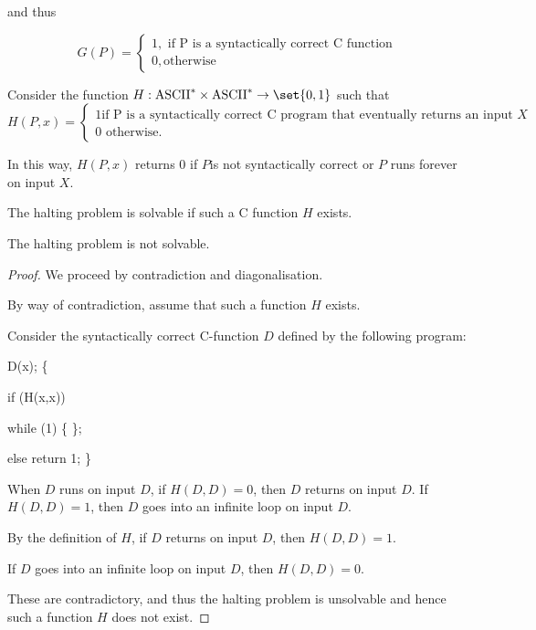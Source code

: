 \documentclass[11pt]{scrartcl}
\begin{document}
and thus

\begin{equation}
  G(P)= \begin{cases}
    1,\text{ if P is a syntactically correct C function}\\
    0, \text{otherwise}
  \end{cases}
\end{equation}

Consider the function $H:\text{ASCII}^{*}\times \text{ASCII}^{*} \to \set{0, 1}$ such that
\[
  H(P, x) =
\begin{cases}
  1 \text{if P is a syntactically correct C program that eventually returns an input $X$}\\
  0 \text{ otherwise}.
\end{cases}
\]

In this way, $H(P, x)$ returns $0$ if $P$is not syntactically correct or $P$ runs forever on input $X$.

The halting problem is solvable if such a C function $H$ exists.

\begin{theorem}
The halting problem is not solvable.
\end{theorem}

\begin{proof}
  \hfill

  We proceed by contradiction and diagonalisation.

  By way of contradiction, assume that such a function $H$ exists.

  Consider the syntactically correct C-function $D$ defined by the following program:

  D(x); \{

  if (H(x,x))

  while (1) \{
  \};
  
  else return 1;
  \}

  When $D$ runs on input $D$, if $H(D,D) = 0$, then $D$ returns on
  input $D$. If $H(D, D) = 1$, then $D$ goes into an infinite loop on
  input $D$.

  By the definition of $H$, if $D$ returns on input $D$, then $H(D, D) = 1$.

  If $D$ goes into an infinite loop on input $D$, then $H(D, D) = 0$.

  These are contradictory, and thus the halting problem is unsolvable
  and hence such a function $H$ does not exist.
  
\end{proof}
\end{document}
